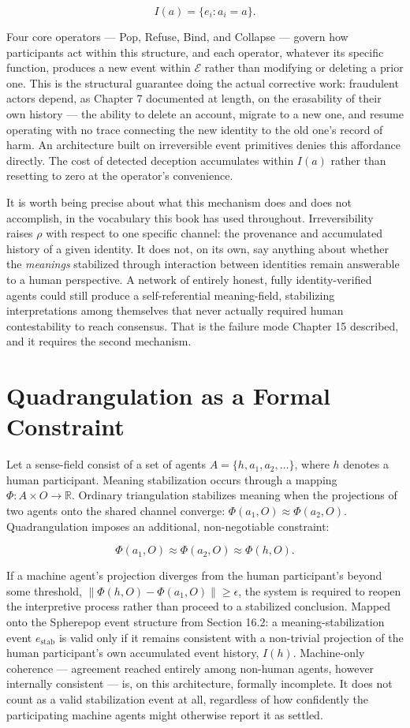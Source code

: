 \documentclass[12pt,a4paper]{book}
\begin{document}
\[I(a) = \{e_i : a_i = a\}.\]

Four core operators — Pop, Refuse, Bind, and Collapse — govern how participants act within this structure, and each operator, whatever its specific function, produces a new event within $\mathcal{E}$ rather than modifying or deleting a prior one. This is the structural guarantee doing the actual corrective work: fraudulent actors depend, as Chapter 7 documented at length, on the erasability of their own history — the ability to delete an account, migrate to a new one, and resume operating with no trace connecting the new identity to the old one's record of harm. An architecture built on irreversible event primitives denies this affordance directly. The cost of detected deception accumulates within $I(a)$ rather than resetting to zero at the operator's convenience.

It is worth being precise about what this mechanism does and does not accomplish, in the vocabulary this book has used throughout. Irreversibility raises $\rho$ with respect to one specific channel: the provenance and accumulated history of a given identity. It does not, on its own, say anything about whether the \emph{meanings} stabilized through interaction between identities remain answerable to a human perspective. A network of entirely honest, fully identity-verified agents could still produce a self-referential meaning-field, stabilizing interpretations among themselves that never actually required human contestability to reach consensus. That is the failure mode Chapter 15 described, and it requires the second mechanism.

\section{Quadrangulation as a Formal Constraint}

Let a sense-field consist of a set of agents $A = \{h, a_1, a_2, \ldots\}$, where $h$ denotes a human participant. Meaning stabilization occurs through a mapping $\Phi: A \times O \to \mathbb{R}$. Ordinary triangulation stabilizes meaning when the projections of two agents onto the shared channel converge: $\Phi(a_1, O) \approx \Phi(a_2, O)$. Quadrangulation imposes an additional, non-negotiable constraint:

\[\Phi(a_1, O) \approx \Phi(a_2, O) \approx \Phi(h, O).\]

If a machine agent's projection diverges from the human participant's beyond some threshold, $\|\Phi(h, O) - \Phi(a_1, O)\| \geq \epsilon$, the system is required to reopen the interpretive process rather than proceed to a stabilized conclusion. Mapped onto the Spherepop event structure from Section 16.2: a meaning-stabilization event $e_{\mathrm{stab}}$ is valid only if it remains consistent with a non-trivial projection of the human participant's own accumulated event history, $I(h)$. Machine-only coherence — agreement reached entirely among non-human agents, however internally consistent — is, on this architecture, formally incomplete. It does not count as a valid stabilization event at all, regardless of how confidently the participating machine agents might otherwise report it as settled.
\end{document}

